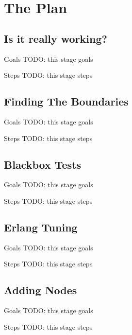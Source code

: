 \documentclass[utf8]{beamer}
\begin{document}
\section{The Plan}
\subsection{Is it really working?}
\begin{frame}{Goals}
	TODO: this stage goals
\end{frame}
\begin{frame}{Steps}
	TODO: this stage steps
\end{frame}

\subsection{Finding The Boundaries}
\begin{frame}{Goals}
	TODO: this stage goals
\end{frame}
\begin{frame}{Steps}
	TODO: this stage steps
\end{frame}

\subsection{Blackbox Tests}
\begin{frame}{Goals}
	TODO: this stage goals
\end{frame}
\begin{frame}{Steps}
	TODO: this stage steps
\end{frame}

\subsection{Erlang Tuning}
\begin{frame}{Goals}
	TODO: this stage goals
\end{frame}
\begin{frame}{Steps}
	TODO: this stage steps
\end{frame}

\subsection{Adding Nodes}
\begin{frame}{Goals}
	TODO: this stage goals
\end{frame}
\begin{frame}{Steps}
	TODO: this stage steps
\end{frame}
\end{document}

